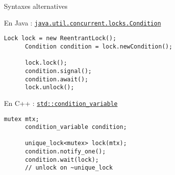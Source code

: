 
\begingroup

\begin{frame}[fragile]{Syntaxes alternatives}
  \begin{block}{En Java : \href{https://docs.oracle.com/javase/7/docs/api/java/util/concurrent/locks/Condition.html}{\lstinline{java.util.concurrent.locks.Condition}}}
    \begin{lstlisting}[gobble=4]
      Lock lock = new ReentrantLock();
      Condition condition = lock.newCondition(); 

      lock.lock();
      condition.signal();
      condition.await();
      lock.unlock();
    \end{lstlisting}
  \end{block}
  \begin{block}{En C++ : \href{http://www.cplusplus.com/reference/condition_variable/condition_variable/}{\lstinline{std::condition_variable}}}
    \begin{lstlisting}[gobble=4]
      mutex mtx;
      condition_variable condition;

      unique_lock<mutex> lock(mtx);
      condition.notify_one();
      condition.wait(lock);
      // unlock on ~unique_lock
    \end{lstlisting}
  \end{block}
\end{frame}

\endgroup
\endinput
